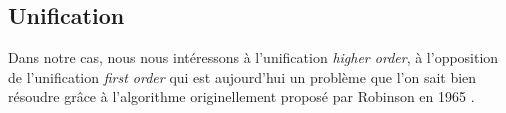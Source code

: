\subsection{Unification}

Dans notre cas, nous nous intéressons à l'unification \textit{higher order}, à l'opposition de l'unification \textit{first order} qui est aujourd'hui un problème que l'on sait bien résoudre grâce à l'algorithme originellement proposé par Robinson en 1965 \cite{robinson1965machine}\cite{robinson1971computational}.